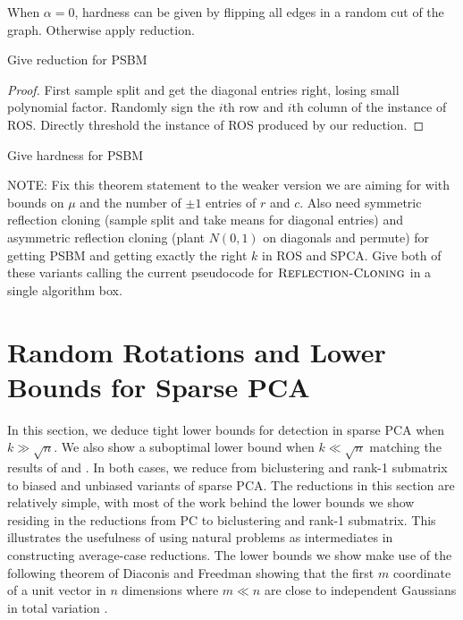 \documentclass[11pt]{article}
\begin{document}
When $\alpha = 0$, hardness can be given by flipping all edges in a random cut of the graph. Otherwise apply reduction.

\begin{lemma}
Give reduction for PSBM
\end{lemma}

\begin{proof}
First sample split and get the diagonal entries right, losing small polynomial factor. Randomly sign the $i$th row and $i$th column of the instance of ROS. Directly threshold the instance of ROS produced by our reduction.
\end{proof}

\begin{theorem}
Give hardness for PSBM
\end{theorem}

NOTE: Fix this theorem statement to the weaker version we are aiming for with bounds on $\mu$ and the number of $\pm 1$ entries of $r$ and $c$. Also need symmetric reflection cloning (sample split and take means for diagonal entries) and asymmetric reflection cloning (plant $N(0, 1)$ on diagonals and permute) for getting PSBM and getting exactly the right $k$ in ROS and SPCA. Give both of these variants calling the current pseudocode for $\textsc{Reflection-Cloning}$ in a single algorithm box.

\section{Random Rotations and Lower Bounds for Sparse PCA}

In this section, we deduce tight lower bounds for detection in sparse PCA when $k \gg \sqrt{n}$. We also show a suboptimal lower bound when $k \ll \sqrt{n}$ matching the results of \cite{berthet2013complexity} and \cite{gao2017sparse}. In both cases, we reduce from biclustering and rank-1 submatrix to biased and unbiased variants of sparse PCA. The reductions in this section are relatively simple, with most of the work behind the lower bounds we show residing in the reductions from PC to biclustering and rank-1 submatrix. This illustrates the usefulness of using natural problems as intermediates in constructing average-case reductions. The lower bounds we show make use of the following theorem of Diaconis and Freedman showing that the first $m$ coordinate of a unit vector in $n$ dimensions where $m \ll n$ are close to independent Gaussians in total variation \cite{diaconis1987dozen}.
\end{document}
